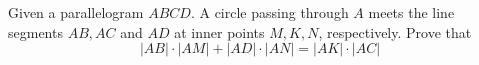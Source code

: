 Given a parallelogram $ABCD$. A circle passing through $A$ meets the line segments $AB, AC$ and $AD$ at inner points $M,K,N$,  respectively. Prove that\[|AB|\cdot |AM | + |AD|\cdot |AN|=|AK|\cdot |AC|\]